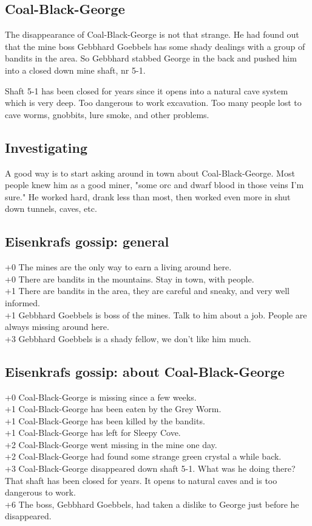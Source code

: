 \documentclass[11pt, twoside, titlepage, a4paper]{report}
\begin{document}
\subsection*{Coal-Black-George}
The disappearance of Coal-Black-George is not that strange. He had found out that the mine boss Gebbhard Goebbels has some shady dealings with a group of bandits in the area. So Gebbhard stabbed George in the back and pushed him into a closed down mine shaft, nr 5-1.

Shaft 5-1 has been closed for years since it opens into a natural cave system which is very deep. Too dangerous to work excavation. Too many people lost to cave worms, gnobbits, lure smoke, and other problems.


\subsection*{Investigating}
A good way is to start asking around in town about Coal-Black-George. Most people knew him as a good miner, "some orc and dwarf blood in those veins I'm sure." He worked hard, drank less than most, then worked even more in shut down tunnels, caves, etc.


\subsection*{Eisenkrafs gossip: general}
+0 The mines are the only way to earn a living around here. \\
+0 There are bandits in the mountains. Stay in town, with people. \\
+1 There are bandits in the area, they are careful and sneaky, and very well informed. \\
+1 Gebbhard Goebbels is boss of the mines. Talk to him about a job. People are always missing around here. \\
+3 Gebbhard Goebbels is a shady fellow, we don't like him much.


\subsection*{Eisenkrafs gossip: about Coal-Black-George}
+0 Coal-Black-George is missing since a few weeks. \\
+1 Coal-Black-George has been eaten by the Grey Worm. \\
+1 Coal-Black-George has been killed by the bandits. \\
+1 Coal-Black-George has left for Sleepy Cove. \\
+2 Coal-Black-George went missing in the mine one day. \\
+2 Coal-Black-George had found some strange green crystal a while back. \\
+3 Coal-Black-George disappeared down shaft 5-1. What was he doing there? That shaft has been closed for years. It opens to natural caves and is too dangerous to work. \\
+6 The boss, Gebbhard Goebbels, had taken a dislike to George just before he disappeared.
\end{document}
